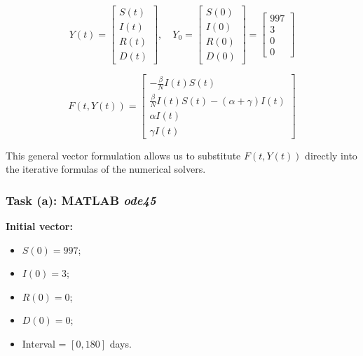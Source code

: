 \documentclass{article}
\begin{document}
\begin{equation}
    Y(t) = 
    \begin{bmatrix}
        S(t) \\
        I(t) \\
        R(t) \\
        D(t)
    \end{bmatrix},
    \quad
    Y_0 = 
    \begin{bmatrix}
        S(0) \\
        I(0) \\
        R(0) \\
        D(0)
    \end{bmatrix}
    =
    \begin{bmatrix}
        997 \\
        3 \\
        0 \\
        0
    \end{bmatrix}
\end{equation}

\begin{equation}
    F(t, Y(t)) = 
    \begin{bmatrix}
        -\frac{\beta}{N}I(t)S(t) \\
        \frac{\beta}{N}I(t)S(t) - (\alpha + \gamma) I(t) \\
        \alpha I(t) \\
        \gamma I(t)
    \end{bmatrix}
\end{equation}

This general vector formulation allows us to substitute $F(t, Y(t))$ directly into the iterative formulas of the numerical solvers.

\subsubsection{Task (a): MATLAB \textit{ode45}}


\vspace{5pt}
\noindent \textbf{Initial vector:}
\begin{itemize}
    \item $S(0) = 997$;
    \item $I(0) = 3$;
    \item $R(0) = 0$;
    \item $D(0) = 0$;
    \item Interval = $[0, 180]$ days.
\end{itemize}
\end{document}
